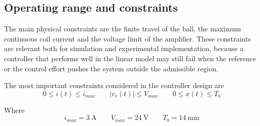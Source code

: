 \subsection{Operating range and constraints}

The main physical constraints are the finite travel of the ball, the maximum continuous coil current and
the voltage limit of the amplifier. These constraints are relevant both for simulation and experimental
implementation, because a controller that performs well in the linear model may still fail when the
reference or the control effort pushes the system outside the admissible region.

The most important constraints considered in the controller design are
\begin{equation}
    0 \leq i(t) \leq i_{max}
    \qquad
    |v_c(t)| \leq V_{max}
    \qquad
    0 \leq x(t) \leq T_b
\end{equation}

Where
\begin{equation}
    i_{max} = 3\ \mathrm{A}
    \qquad
    V_{max} = 24\ \mathrm{V}
    \qquad
    T_b = 14\ \mathrm{mm}
\end{equation}
